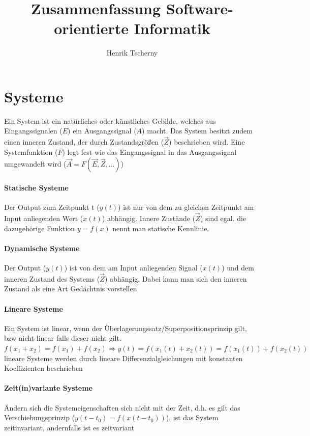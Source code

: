 \documentclass[12pt,a4paper]{article}
\title{Zusammenfassung Software-orientierte Informatik}
\author{Henrik Tscherny}
\begin{document}
\maketitle
\tableofcontents

\section{Systeme}
Ein System ist ein natürliches oder künstliches Gebilde, welches aus Eingangssignalen ($E$) ein Ausgangssignal ($A$) macht. Das System besitzt zudem einen inneren Zustand, der durch Zustandsgrößen ($\vec{Z}$) beschrieben wird. Eine Systemfunktion ($F$) legt fest wie das Eingangssignal in das Ausgangssignal umgewandelt wird ($\vec{A} = F(\vec{E}, \vec{Z},...)$)

\paragraph{Statische Systeme}
Der Output zum Zeitpunkt t ($y(t)$) ist nur von dem zu gleichen Zeitpunkt am Input anliegenden Wert ($x(t)$) abhängig. Innere Zustände ($\vec{Z}$) sind egal. die dazugehörige Funktion $y=f(x)$ nennt man statische Kennlinie.

\paragraph{Dynamische Systeme}
Der Output ($y(t)$) ist von dem am Input anliegenden Signal ($x(t)$) und dem inneren Zustand des Systems ($\vec{Z}$) abhängig. Dabei kann man sich den inneren Zustand als eine Art Gedächtnis vorstellen

\paragraph{Lineare Systeme}
Ein System ist linear, wenn der Überlagerungssatz/Superpositionsprinzip gilt, bzw nicht-linear falls dieser nicht gilt.\\
$f(x_1 + x_2) = f(x_1) + f(x_2) \Rightarrow y(t) = f(x_1(t) + x_2(t)) = f(x_1(t)) + f(x_2(t))$\\
lineare Systeme werden durch lineare Differenzialgleichungen mit konstanten Koeffizienten beschrieben

\paragraph{Zeit(in)variante Systeme}
Ändern sich die Systemeigenschaften sich nicht mit der Zeit, d.h. es gilt das Verschiebungsprinzip ($y(t-t_0) = f(x(t-t_0))$), ist das System zeitinvariant, andernfalls ist es zeitvariant
\end{document}
